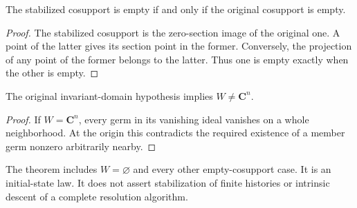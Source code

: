 \begin{lemma}
\label{hir:disjoint-zero-coordinate-initial-empty}
\leanok
The stabilized cosupport is empty if and only if the original cosupport is
empty.
\end{lemma}
\begin{proof}
The stabilized cosupport is the zero-section image of the original one.
A point of the latter gives its section point in the former. Conversely,
the projection of any point of the former belongs to the latter. Thus one
is empty exactly when the other is empty.
\end{proof}

\begin{lemma}
\label{hir:disjoint-zero-coordinate-initial-proper}
\leanok
The original invariant-domain hypothesis implies $W\ne\mathbf C^n$.
\end{lemma}
\begin{proof}
If $W=\mathbf C^n$, every germ in its vanishing ideal vanishes on a whole
neighborhood. At the origin this contradicts the required existence of a
member germ nonzero arbitrarily nearby.
\end{proof}

\begin{remark}
The theorem includes $W=\varnothing$ and every other empty-cosupport case.
It is an initial-state law. It does not assert stabilization of finite
histories or intrinsic descent of a complete resolution algorithm.
\end{remark}
